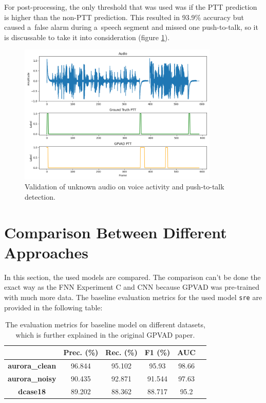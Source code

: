     For post-processing, the only threshold that was used was if the PTT prediction is higher than the non-PTT prediction. This resulted in 93.9\% accuracy but caused a~false alarm during a~speech segment and missed one push-to-talk, so it is discussable to take it into consideration (figure \ref{fig:gpvadoutputmlt}). 

    \begin{figure}[ht!]
        \centering
        \includegraphics[width = 0.85\textwidth]{obrazky-figures/GPVADMLT.png}
        \caption{Validation of unknown audio on voice activity and push-to-talk detection.}
        \label{fig:gpvadoutputmlt}
    \end{figure}


\newpage

\section{Comparison Between Different Approaches}\label{final comparison}


    In this section, the used models are compared. The comparison can't be done the exact way as the FNN Experiment C and CNN because GPVAD was pre-trained with much more data. The baseline evaluation metrics for the used model \texttt{sre} are provided in the following table: 

    \begin{table}[!h]
    \begin{center}
    \begin{tabular}{|c|c|c|c|c|c|}\hline 
        & \textbf{Prec. (\%)} & \textbf{Rec. (\%)} & \textbf{F1 (\%)} & \textbf{AUC} \\ \hline
        \textbf{aurora\_clean}  & 96.844 & 95.102 & 95.93  & 98.66\\ \hline
        \textbf{aurora\_noisy}  & 90.435 & 92.871 &	91.544 & 97.63\\ \hline
        \textbf{dcase18}        & 89.202 & 88.362 &	88.717 & 95.2  \\ \hline 
    \end{tabular}
    \caption{The evaluation metrics for baseline model on different datasets, which is further explained in the original GPVAD paper.}
    \label{baselinegpvad}
    \end{center}
    \end{table}

